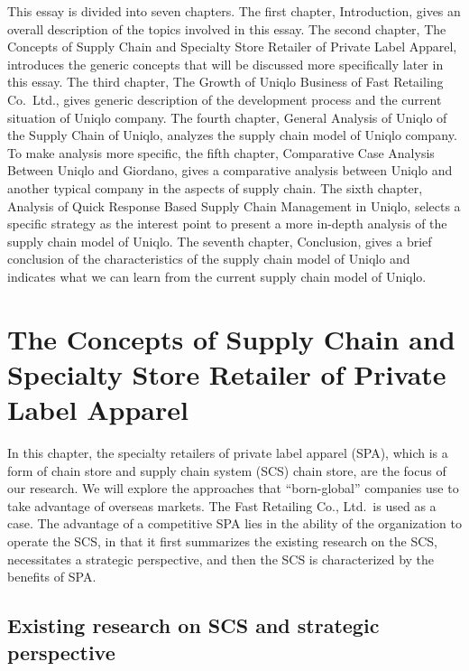 \documentclass[12pt,a4paper]{article}
\begin{document}
This essay is divided into seven chapters. The first chapter,
Introduction, gives an overall description of the topics involved in
this essay. The second chapter, The Concepts of Supply Chain and
Specialty Store Retailer of Private Label Apparel, introduces the
generic concepts that will be discussed more specifically later in this
essay. The third chapter, The Growth of Uniqlo Business of Fast
Retailing Co.~Ltd., gives generic description of the development process
and the current situation of Uniqlo company. The fourth chapter, General
Analysis of Uniqlo of the Supply Chain of Uniqlo, analyzes the supply
chain model of Uniqlo company. To make analysis more specific, the fifth
chapter, Comparative Case Analysis Between Uniqlo and Giordano, gives a
comparative analysis between Uniqlo and another typical company in the
aspects of supply chain. The sixth chapter, Analysis of Quick Response
Based Supply Chain Management in Uniqlo, selects a specific strategy as
the interest point to present a more in-depth analysis of the supply
chain model of Uniqlo. The seventh chapter, Conclusion, gives a brief
conclusion of the characteristics of the supply chain model of Uniqlo
and indicates what we can learn from the current supply chain model of
Uniqlo.

\hypertarget{the-concepts-of-supply-chain-and-specialty-store-retailer-of-private-label-apparel}{%
\section{The Concepts of Supply Chain and Specialty Store Retailer of
Private Label
Apparel}\label{the-concepts-of-supply-chain-and-specialty-store-retailer-of-private-label-apparel}}

In this chapter, the specialty retailers of private label apparel (SPA),
which is a form of chain store and supply chain system (SCS) chain
store, are the focus of our research. We will explore the approaches
that ``born-global'' companies use to take advantage of overseas
markets. The Fast Retailing Co., Ltd.~is used as a case. The advantage
of a competitive SPA lies in the ability of the organization to operate
the SCS, in that it first summarizes the existing research on the SCS,
necessitates a strategic perspective, and then the SCS is characterized
by the benefits of SPA.

\hypertarget{existing-research-on-scs-and-strategic-perspective}{%
\subsection{Existing research on SCS and strategic
perspective}\label{existing-research-on-scs-and-strategic-perspective}}
\end{document}
